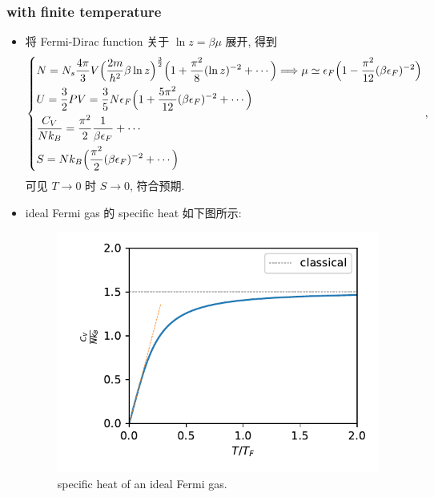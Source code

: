 \subsubsection{with finite temperature}
\begin{itemize}
	\item 将 Fermi-Dirac function 关于 $\ln z = \beta \mu$ 展开, 得到
	\begin{equation} \label{8.1.10}
		\begin{dcases}
			N = N_s \frac{4 \pi}{3} V \Big( \frac{2 m}{h^2} \beta \ln z \Big)^{\frac{3}{2}} \Big( 1 + \frac{\pi^2}{8} (\ln z)^{- 2} + \cdots \Big) \Longrightarrow \mu \simeq \epsilon_F \Big( 1 - \frac{\pi^2}{12} (\beta \epsilon_F)^{- 2} \Big) \\
			U = \frac{3}{2} P V = \frac{3}{5} N \epsilon_F \Big( 1 + \frac{5 \pi^2}{12} (\beta \epsilon_F)^{- 2} + \cdots \Big) \\
			\frac{C_V}{N k_B} = \frac{\pi^2}{2} \frac{1}{\beta \epsilon_F} + \cdots \\
			S = N k_B \Big( \frac{\pi^2}{2} (\beta \epsilon_F)^{- 2} + 
			\cdots \Big)
		\end{dcases},
	\end{equation}
	可见 $T \rightarrow 0$ 时 $S \rightarrow 0$, 符合预期.
	
	\item ideal Fermi gas 的 specific heat 如下图所示:
	
	\begin{figure}[H]
		\centering
		\includegraphics[scale=0.8]{figures/specific heat of an ideal Fermi gas.pdf}
		\caption{specific heat of an ideal Fermi gas.}
	\end{figure}
\end{itemize}

